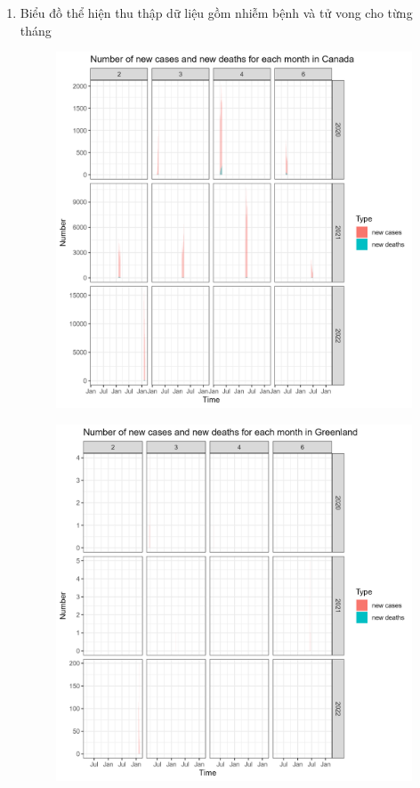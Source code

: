 \documentclass[a4paper]{article}
\theoremstyle{definition}
\begin{document}
\begin{enumerate}[i)]
\begin{enumerate}[1)]
\begin{figure}[H]
			\end{figure}
			\item Biểu đồ thể hiện thu thập dữ liệu gồm nhiễm bệnh và tử vong cho từng tháng
			\begin{figure}[H]
				\centering
				\includegraphics[scale=0.25]{images/6.3.1.png}
			\end{figure}
			\begin{figure}[H]
				\centering
				\includegraphics[scale=0.25]{images/6.3.2.png}

\end{figure}
\end{enumerate}
\end{enumerate}
\end{document}
